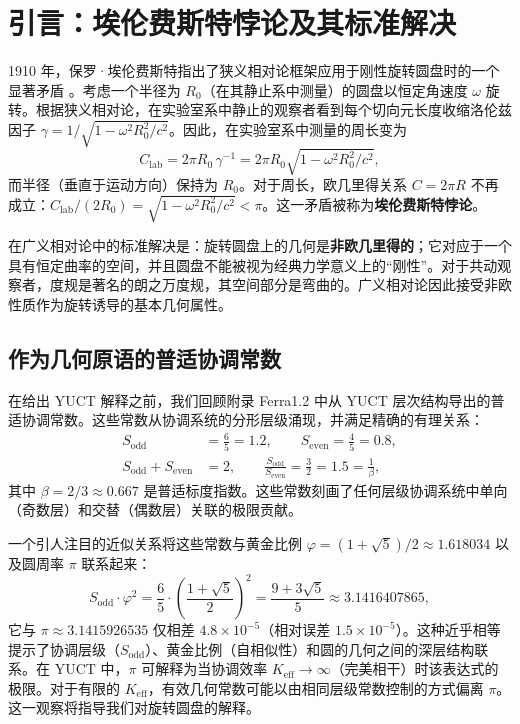 \documentclass[12pt,a4paper]{article}
\newcommand{\betaf}{\beta}
\newcommand{\Sodd}{S_{\mathrm{odd}}}
\newcommand{\Seven}{S_{\mathrm{even}}}
\begin{document}
	\tableofcontents
	\newpage
	
	\section{引言：埃伦费斯特悖论及其标准解决}
	\label{sec:intro}
	
	1910 年，保罗·埃伦费斯特指出了狭义相对论框架应用于刚性旋转圆盘时的一个显著矛盾 \cite{Ehrenfest1909}。考虑一个半径为 \(R_0\)（在其静止系中测量）的圆盘以恒定角速度 \(\omega\) 旋转。根据狭义相对论，在实验室系中静止的观察者看到每个切向元长度收缩洛伦兹因子 \(\gamma = 1/\sqrt{1 - \omega^2 R_0^2/c^2}\)。因此，在实验室系中测量的周长变为
	\[
	C_{\text{lab}} = 2\pi R_0 \, \gamma^{-1} = 2\pi R_0 \sqrt{1 - \omega^2 R_0^2/c^2},
	\]
	而半径（垂直于运动方向）保持为 \(R_0\)。对于周长，欧几里得关系 \(C = 2\pi R\) 不再成立：\(C_{\text{lab}}/(2R_0) = \sqrt{1 - \omega^2 R_0^2/c^2} < \pi\)。这一矛盾被称为\textbf{埃伦费斯特悖论}。
	
	在广义相对论中的标准解决是：旋转圆盘上的几何是\textbf{非欧几里得的}；它对应于一个具有恒定曲率的空间，并且圆盘不能被视为经典力学意义上的“刚性”。对于共动观察者，度规是著名的朗之万度规，其空间部分是弯曲的。广义相对论因此接受非欧性质作为旋转诱导的基本几何属性。
	
	\subsection{作为几何原语的普适协调常数}
	
	在给出 YUCT 解释之前，我们回顾附录 Ferra1.2 中从 YUCT 层次结构导出的普适协调常数。这些常数从协调系统的分形层级涌现，并满足精确的有理关系：
	\begin{align}
		\Sodd &= \frac{6}{5} = 1.2, \qquad \Seven = \frac{4}{5} = 0.8, \\
		\Sodd + \Seven &= 2, \qquad \frac{\Sodd}{\Seven} = \frac{3}{2} = 1.5 = \frac{1}{\betaf},
	\end{align}
	其中 \(\betaf = 2/3 \approx 0.667\) 是普适标度指数。这些常数刻画了任何层级协调系统中单向（奇数层）和交替（偶数层）关联的极限贡献。
	
	一个引人注目的近似关系将这些常数与黄金比例 \(\varphi = (1+\sqrt{5})/2 \approx 1.618034\) 以及圆周率 \(\pi\) 联系起来：
	\begin{equation}
		\Sodd \cdot \varphi^2 = \frac{6}{5} \cdot \left(\frac{1+\sqrt{5}}{2}\right)^2 = \frac{9+3\sqrt{5}}{5} \approx 3.1416407865,
	\end{equation}
	它与 \(\pi \approx 3.1415926535\) 仅相差 \(4.8\times10^{-5}\)（相对误差 \(1.5\times10^{-5}\)）。这种近乎相等提示了协调层级（\(\Sodd\)）、黄金比例（自相似性）和圆的几何之间的深层结构联系。在 YUCT 中，\(\pi\) 可解释为当协调效率 \(K_{\mathrm{eff}} \to \infty\)（完美相干）时该表达式的极限。对于有限的 \(K_{\mathrm{eff}}\)，有效几何常数可能以由相同层级常数控制的方式偏离 \(\pi\)。这一观察将指导我们对旋转圆盘的解释。
	
\end{document}
